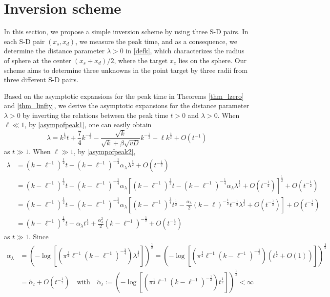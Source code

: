 \documentclass[10pt]{article}
\numberwithin{equation}{section}
\numberwithin{figure}{section}
\begin{document}
\section{Inversion scheme}\label{sec_inversion}
In this section, we propose a simple inversion scheme by using three S-D pairs. In each S-D pair $(x_s, x_d)$, we measure the peak time, and as a consequence, we determine the distance parameter $\lambda>0$ in \eqref{defk}, which characterizes the radius of sphere at the center $(x_s+x_d)/2$, where the target $x_c$ lies on the sphere. Our scheme aims to determine three unknowns in the point target by three radii from three different S-D pairs.

Based on the asymptotic expansions for the peak time in Theorems \ref{thm_lzero} and \ref{thm_linfty}, we derive the asymptotic expansions for the distance parameter $\lambda>0$ by inverting the relations between the peak time $t>0$ and $\lambda>0$. 
When $\ell \ll 1$, by \eqref{asympofpeak1}, one can easily obtain
\begin{equation}\label{lambda_expan1}
\lambda = k^\frac{1}{2}t + \frac{7}{4}k^{-\frac{1}{2}} - 
\frac{\sqrt{k}}{\sqrt{k} + \beta \sqrt{vD}}k^{-\frac{1}{2}}
-\ell k^\frac{1}{2} + O\left( t^{-1} \right) 
\end{equation}
as $t \gg 1$. When $\ell \gg 1$, by \eqref{asympofpeak2}, 
\begin{equation*}
\begin{split}
\lambda &= (k-\ell^{-1})^\frac{1}{2} t -  (k-\ell^{-1})^{-\frac{1}{4}} \alpha_\lambda \lambda^\frac{1}{2} + O\left( t^{-\frac{1}{2}} \right) \\
&= (k-\ell^{-1})^\frac{1}{2} t -  (k-\ell^{-1})^{-\frac{1}{4}}\alpha_\lambda\left[ (k-\ell^{-1})^\frac{1}{2} t -  (k-\ell^{-1})^{-\frac{1}{4}} \alpha_\lambda \lambda^\frac{1}{2} + O\left( t^{-\frac{1}{2}} \right) \right]^\frac{1}{2}  +O\left( t^{-\frac{1}{2}} \right) \\
&=(k-\ell^{-1})^\frac{1}{2} t -  (k-\ell^{-1})^{-\frac{1}{4}}\alpha_\lambda\left[ (k-\ell^{-1})^\frac{1}{4} t^\frac{1}{2} - \frac{\alpha_\lambda}{2}(k-\ell)^{-\frac{1}{2}} t^{-\frac{1}{2}} \lambda^\frac{1}{2} + O\left( t^{-\frac{1}{2}} \right)
\right] + O\left( t^{-\frac{1}{2}} \right) \\
&=(k-\ell^{-1})^\frac{1}{2}t - \alpha_\lambda t^\frac{1}{2} + \frac{\alpha_\lambda^2}{2} (k-\ell^{-1})^{-\frac{1}{2}}+ O\left( t^{-\frac{1}{2}} \right)
\end{split}
\end{equation*}
as $t \gg 1$. Since
\begin{equation*}
\begin{split}
\alpha_\lambda &= \left(-\log\left[ (\pi^{\frac{1}{2}} \ell^{-1} (k-\ell^{-1})^{-\frac{3}{4}}) \lambda^\frac{1}{2} \right] \right)^\frac{1}{2} =\left(-\log\left[ (\pi^{\frac{1}{2}} \ell^{-1} (k-\ell^{-1})^{-\frac{1}{2}}) (t^\frac{1}{2} + O(1)) \right] \right)^\frac{1}{2}  \\
&= \tilde \alpha_t +  O\left( t^{-\frac{1}{2}} \right)\quad \mbox{with} \quad \tilde \alpha_t:=
 \left(-\log\left[ (\pi^{\frac{1}{2}} \ell^{-1} (k-\ell^{-1})^{-\frac{1}{2}}) t^\frac{1}{2} \right] \right)^\frac{1}{2} < \infty
\end{split}
\end{equation*}
\end{document}
